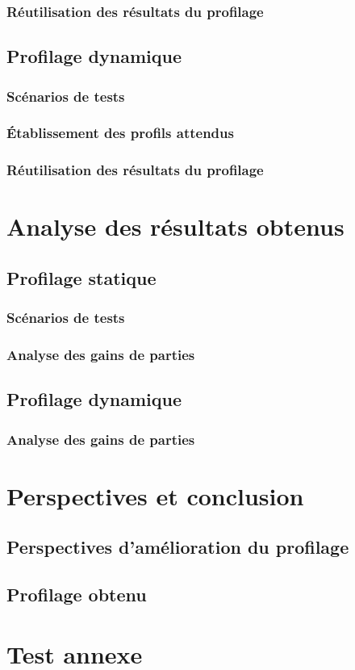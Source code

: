 \documentclass{report}
\begin{document}
\subsection{Réutilisation des résultats du profilage}

\section{Profilage dynamique}
\subsection{Scénarios de tests}
\subsection{Établissement des profils attendus}
\subsection{Réutilisation des résultats du profilage}


\chapter{Analyse des résultats obtenus}

\section{Profilage statique}
\subsection{Scénarios de tests}
\subsection{Analyse des gains de parties}

\section{Profilage dynamique}
\subsection{Analyse des gains de parties}


\chapter{Perspectives et conclusion}
\section{Perspectives d'amélioration du profilage}
\section{Profilage obtenu}



\nocite{*}


\appendix
\chapter{Test annexe}
\end{document}
